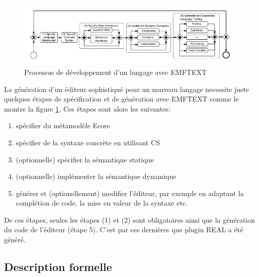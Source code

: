 \begin{figure}[h!]
  \includegraphics[scale=0.7]{images/EMFTEXT_process.png}
  \caption{Processus de développement d'un langage avec EMFTEXT}
  \label{fig:EMFTEXT_process}
\end{figure}

La génération d'un éditeur sophistiqué pour un nouveau langage necessite juste quelques étapes de spécification et de génération avec EMFTEXT comme le montre la figure \ref{fig:EMFTEXT_process}. Ces étapes sont alors les suivantes:
\begin{enumerate}
	\item spécifier du métamodèle Ecore
	\item spécifier de la syntaxe concrète en utilisant CS
	\item (optionnelle) spécifier la sémantique statique 
	\item (optionnelle) implémenter la sémantique dynamique 
	\item générer et (optionellement) modifier l'éditeur, par exemple en adaptant la complétion de code, la mise en valeur de la syntaxe etc.
\end{enumerate}

De ces étapes, seules les étapes (1) et (2) sont obligatoires ainsi que la génération du code de l'éditeur (étape 5). C'est par ces dernières que plugin REAL a été généré. 
\subsection{Description formelle}

